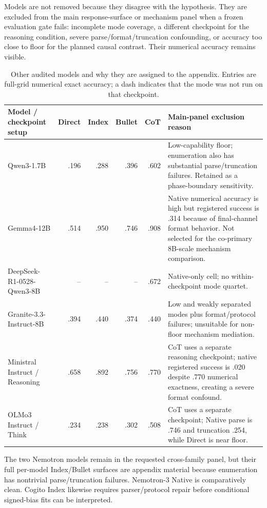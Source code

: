Models are not removed because they disagree with the hypothesis. They are excluded from the main response-surface or mechanism panel when a frozen evaluation gate fails: incomplete mode coverage, a different checkpoint for the reasoning condition, severe parse/format/truncation confounding, or accuracy too close to floor for the planned causal contrast. Their numerical accuracy remains visible.

\begin{table}[H]
\centering
\scriptsize
\caption{Other audited models and why they are assigned to the appendix. Entries are full-grid numerical exact accuracy; a dash indicates that the mode was not run on that checkpoint.}
\label{tab:excluded-models}
\begin{tabularx}{\textwidth}{@{}P{.22\textwidth}rrrrY@{}}
\toprule
Model / checkpoint setup & Direct & Index & Bullet & CoT & Main-panel exclusion reason \\
\midrule
Qwen3-1.7B
  & .196 & .288 & .396 & .602
  & Low-capability floor; enumeration also has substantial parse/truncation failures. Retained as a phase-boundary sensitivity. \\
Gemma4-12B
  & .514 & .950 & .746 & .908
  & Native numerical accuracy is high but registered success is .314 because of final-channel format behavior. Not selected for the co-primary 8B-scale mechanism comparison. \\
DeepSeek-R1-0528-Qwen3-8B
  & -- & -- & -- & .672
  & Native-only cell; no within-checkpoint mode quartet. \\
Granite-3.3-Instruct-8B
  & .394 & .440 & .374 & .440
  & Low and weakly separated modes plus format/protocol failures; unsuitable for non-floor mechanism mediation. \\
Ministral Instruct / Reasoning
  & .658 & .892 & .756 & .770
  & CoT uses a separate reasoning checkpoint; native registered success is .020 despite .770 numerical exactness, creating a severe format confound. \\
OLMo3 Instruct / Think
  & .234 & .238 & .302 & .508
  & CoT uses a separate checkpoint; Native parse is .746 and truncation .254, while Direct is near floor. \\
\bottomrule
\end{tabularx}
\end{table}

The two Nemotron models remain in the requested cross-family panel, but their full per-model Index/Bullet surfaces are appendix material because enumeration has nontrivial parse/truncation failures. Nemotron-3 Native is comparatively clean. Cogito Index likewise requires parser/protocol repair before conditional signed-bias fits can be interpreted.

